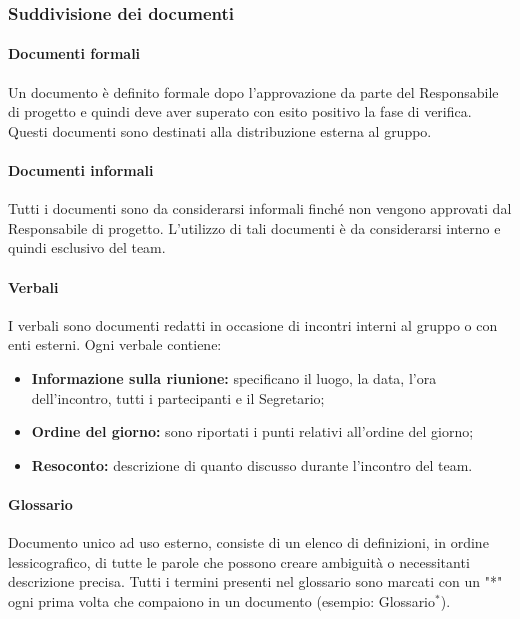 \documentclass[11pt,a4paper]{article}
\begin{document}
{	\subsubsection{Suddivisione dei documenti}
	\paragraph{Documenti formali\\}
	Un documento è definito formale dopo l’approvazione da parte del Responsabile di progetto e quindi deve aver superato con esito positivo la fase di verifica. Questi documenti sono destinati alla distribuzione esterna al gruppo.
	
	\paragraph{Documenti informali\\}
	Tutti i documenti sono da considerarsi informali finché non vengono approvati dal Responsabile di progetto. L’utilizzo di tali documenti è da considerarsi interno e quindi esclusivo del team.
	
	\paragraph{Verbali\\}
	I verbali sono documenti redatti in occasione di incontri interni al gruppo o con enti esterni. Ogni verbale contiene:
	
	\begin{itemize}
		\item \textbf{Informazione sulla riunione:} specificano il luogo, la data, l'ora dell’incontro, tutti i partecipanti e il Segretario;
		\item \textbf{Ordine del giorno:} sono riportati i punti relativi all’ordine del giorno;
		\item \textbf{Resoconto:} descrizione di quanto discusso durante l'incontro del team.
	\end{itemize}
	
	\paragraph{Glossario\\}
	Documento unico ad uso esterno, consiste di un elenco di definizioni, in ordine lessicografico, di tutte le parole che possono creare ambiguità o necessitanti descrizione precisa. Tutti i termini presenti nel glossario sono marcati con un "*" ogni prima volta che compaiono in un documento (esempio: Glossario$^*$).
	
}
\end{document}
